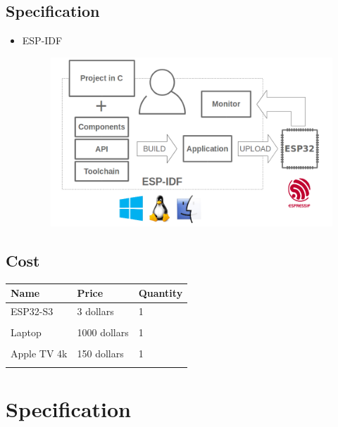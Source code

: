 \documentclass[conference]{IEEEtran}
\begin{document}
\begin{enumerate}[label=\arabic*.]
\end{enumerate}

\subsection{\large{Specification}}
\begin{itemize}
\item ESP-IDF\\
\begin{figure}[H]\centering \includegraphics[scale=0.33]{images/esp-idf.png}\end{figure}
\end{itemize}


\subsection{\large{Cost}}
\begin{table}[H]
\center
\begin{tabular}{m{1.7cm} m{1.4cm} m{1.4cm}}
\toprule
Name & Price & Quantity\\
\midrule
ESP32-S3 & 3 dollars &1\\\\
Laptop & 1000 dollars & 1\\\\
Apple TV 4k & 150 dollars & 1\\\\
\bottomrule
\end{tabular}
\end{table}


\section{\large{Specification}}
\end{document}
